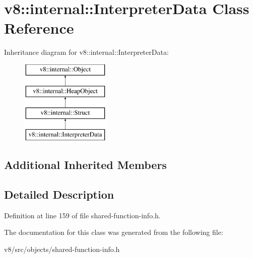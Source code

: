 \hypertarget{classv8_1_1internal_1_1InterpreterData}{}\section{v8\+:\+:internal\+:\+:Interpreter\+Data Class Reference}
\label{classv8_1_1internal_1_1InterpreterData}
Inheritance diagram for v8\+:\+:internal\+:\+:Interpreter\+Data\+:\begin{figure}[H]
\begin{center}
\leavevmode
\includegraphics[height=4.000000cm]{classv8_1_1internal_1_1InterpreterData}
\end{center}
\end{figure}
\subsection*{Additional Inherited Members}


\subsection{Detailed Description}


Definition at line 159 of file shared-\/function-\/info.\+h.



The documentation for this class was generated from the following file\+:\begin{DoxyCompactItemize}
\item 
v8/src/objects/shared-\/function-\/info.\+h\end{DoxyCompactItemize}
